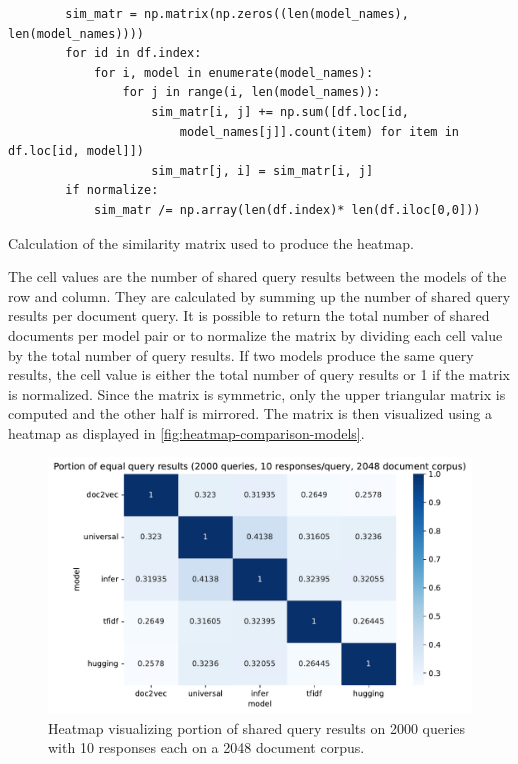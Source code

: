 \begin{listing}[htp]
    \begin{verbatim}
        sim_matr = np.matrix(np.zeros((len(model_names), len(model_names))))
        for id in df.index:
            for i, model in enumerate(model_names):
                for j in range(i, len(model_names)):
                    sim_matr[i, j] += np.sum([df.loc[id, 
                        model_names[j]].count(item) for item in df.loc[id, model]])
                    sim_matr[j, i] = sim_matr[i, j]
        if normalize:
            sim_matr /= np.array(len(df.index)* len(df.iloc[0,0]))
    \end{verbatim}
    \caption{Calculation of the similarity matrix used to produce the heatmap.
    }
    \label{lst:sim-matrix}
\end{listing}

The cell values are the number of shared query results between the models of the row and column.
They are calculated by summing up the number of shared query results per document query.
It is possible to return the total number of shared documents per model pair
or to normalize the matrix by dividing each cell value by the total number of query results.
If two models produce the same query results, the cell value is either the total number of query results or 1 if the matrix is normalized.
Since the matrix is symmetric, only the upper triangular matrix is computed and the other half is mirrored.
The matrix is then visualized using a heatmap as displayed in \autoref{fig:heatmap-comparison-models}.

\begin{figure}[!htb] %
    \centering
    \includegraphics[width=1\textwidth]{images/comparison/Portion_of_equal_query_results_(2000_queries,_10_responses_query,_2048_document_corpus).pdf}
    \caption[Comparison of models using a heatmap]
    {Heatmap visualizing portion of shared query results on 2000 queries with 10 responses each on a 2048 document corpus.}
    \label{fig:heatmap-comparison-models}
\end{figure}

